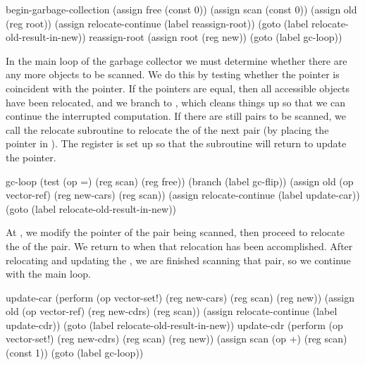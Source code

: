 \begin{codeBlock}
begin-garbage-collection
  (assign free (const 0))
  (assign scan (const 0))
  (assign old (reg root))
  (assign relocate-continue (label reassign-root))
  (goto (label relocate-old-result-in-new))
reassign-root
  (assign root (reg new))
  (goto (label gc-loop))
\end{codeBlock}

\noindent
In the main loop of the garbage collector we must determine whether there are
any more objects to be scanned.  We do this by testing whether the 
pointer is coincident with the  pointer.  If the pointers are equal,
then all accessible objects have been relocated, and we branch to
, which cleans things up so that we can continue the interrupted
computation.  If there are still pairs to be scanned, we call the relocate
subroutine to relocate the  of the next pair (by placing the
 pointer in ).  The  register is
set up so that the subroutine will return to update the  pointer.

\begin{codeBlock}
gc-loop
  (test (op =) (reg scan) (reg free))
  (branch (label gc-flip))
  (assign old (op vector-ref)
          (reg new-cars)
          (reg scan))
  (assign relocate-continue
          (label update-car))
  (goto (label relocate-old-result-in-new))
\end{codeBlock}

\noindent
At , we modify the  pointer of the pair being
scanned, then proceed to relocate the  of the pair.  We return to
 when that relocation has been accomplished.  After relocating
and updating the , we are finished scanning that pair, so we continue
with the main loop.

\begin{codeBlock}
update-car
  (perform (op vector-set!)
           (reg new-cars)
           (reg scan)
           (reg new))
  (assign old (op vector-ref) (reg new-cdrs) (reg scan))
  (assign relocate-continue (label update-cdr))
  (goto (label relocate-old-result-in-new))
update-cdr
  (perform (op vector-set!)
           (reg new-cdrs)
           (reg scan)
           (reg new))
  (assign scan (op +) (reg scan) (const 1))
  (goto (label gc-loop))
\end{codeBlock}

